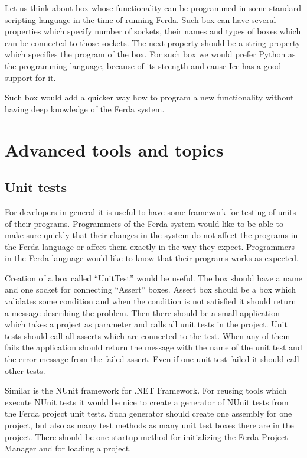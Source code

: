 \documentclass[a4paper,12pt]{book}
\begin{document}
Let us think about box whose functionality can be programmed in some standard scripting language in the time of running Ferda. Such box can have several properties which specify number of sockets, their names and types of boxes which can be connected to those sockets. The next property should be a string property which specifies the program of the box. For such box we would prefer Python as the programming language, because of its strength and cause Ice has a good support for it.

Such box would add a quicker way how to program a new functionality without having deep knowledge of the Ferda system. 

\section{Advanced tools and topics}
\label{sec:advancedToopics}
\subsection{Unit tests}
For developers in general it is useful to have some framework for testing of units of their programs. Programmers of the Ferda system would like to be able to make sure quickly that their changes in the system do not affect the programs in the Ferda language or affect them exactly in the way they expect. Programmers in the Ferda language would like to know that their programs works as expected.

Creation of a box called ``UnitTest'' would be useful. The box should have a name and one socket for connecting ``Assert'' boxes. Assert box should be a box which validates some condition and when the condition is not satisfied it should return a message describing the problem. Then there should be a small application which takes a project as parameter and calls all unit tests in the project. Unit tests should call all asserts which are connected to the test. When any of them fails the application should return the message with the name of the unit test and the error message from the failed assert. Even if one unit test failed it should call other tests.

Similar is the NUnit framework for .NET Framework. For reusing tools which execute NUnit tests it would be nice to create a generator of NUnit tests from the Ferda project unit tests. Such generator should create one assembly for one project, but also as many test methods as many unit test boxes there are in the project. There should be one startup method for initializing the Ferda Project Manager and for loading a project. 
\end{document}
